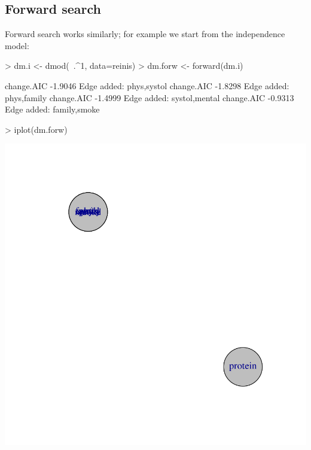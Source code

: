 \documentclass[12pt]{article}
\begin{document}
\subsection{Forward search}
\label{sec:xxx}

Forward search works similarly; for example we start from the
independence model:

\begin{Schunk}
\begin{Sinput}
> dm.i   <- dmod(~.^1, data=reinis)
> dm.forw <- forward(dm.i)
\end{Sinput}
\begin{Soutput}
  change.AIC   -1.9046 Edge added: phys,systol
  change.AIC   -1.8298 Edge added: phys,family
  change.AIC   -1.4999 Edge added: systol,mental
  change.AIC   -0.9313 Edge added: family,smoke
\end{Soutput}
\begin{Sinput}
> iplot(dm.forw)
\end{Sinput}
\end{Schunk}
\includegraphics{figures/GRIM-035}

\end{document}
